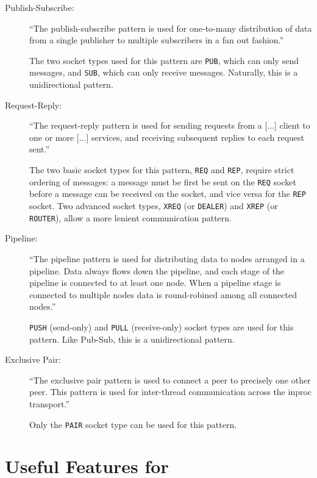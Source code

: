 \begin{description}

\item[Publish-Subscribe:]

``The publish-subscribe pattern is used for one-to-many distribution of data from a single publisher to multiple
subscribers in a fan out fashion.''

The two socket types used for this pattern are \texttt{PUB}, which can only send messages, and \texttt{SUB}, which can
only receive messages. Naturally, this is a unidirectional pattern.

\item[Request-Reply:]

``The request-reply pattern is used for sending requests from a [...] client to one or more [...] services, and receiving
subsequent replies to each request sent.''

The two basic socket types for this pattern, \texttt{REQ} and \texttt{REP}, require strict ordering of messages: a
message must be first be sent on the \texttt{REQ} socket before a message can be received on the socket, and vice versa
for the \texttt{REP} socket. Two advanced socket types, \texttt{XREQ} (or \texttt{DEALER}) and \texttt{XREP} (or
\texttt{ROUTER}), allow a more lenient communication pattern.

\item[Pipeline:]

``The pipeline pattern is used for distributing data to nodes arranged in a pipeline. Data always flows down the
pipeline, and each stage of the pipeline is connected to at least one node. When a pipeline stage is connected to
multiple nodes data is round-robined among all connected nodes.''

\texttt{PUSH} (send-only) and \texttt{PULL} (receive-only) socket types are used for this pattern. Like Pub-Sub, this is
a unidirectional pattern.

\item[Exclusive Pair:]

``The exclusive pair pattern is used to connect a peer to precisely one other peer. This pattern is used for inter-thread
communication across the inproc transport.''

Only the \texttt{PAIR} socket type can be used for this pattern.

\end{description}

\section{Useful Features for \dcamp}

